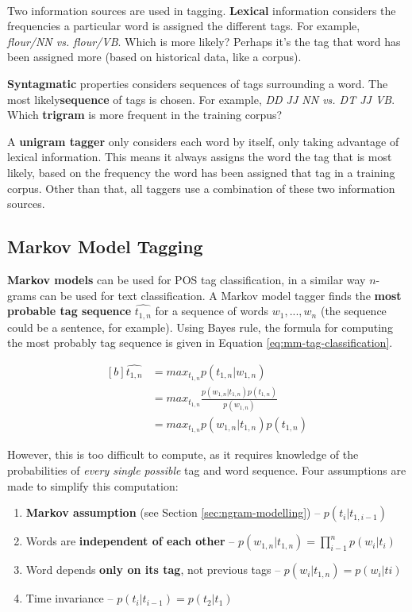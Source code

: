 \documentclass{article}
\begin{document}
\paragraph{}

Two information sources are used in tagging. \textbf{Lexical} information considers the frequencies a particular word is assigned the different tags. For example, \textit{flour/NN vs. flour/VB}. Which is more likely? Perhaps it's the tag that word has been assigned more (based on historical data, like a corpus).

\textbf{Syntagmatic} properties considers sequences of tags surrounding a word. The most likely\textbf{sequence} of tags is chosen. For example, \textit{DD JJ NN vs. DT JJ VB}. Which \textbf{trigram} is more frequent in the training corpus?

A \textbf{unigram tagger} only considers each word by itself, only taking advantage of lexical information. This means it always assigns the word the tag that is most likely, based on the frequency the word has been assigned that tag in a training corpus. Other than that, all taggers use a combination of these two information sources.

\subsection{Markov Model Tagging}

\textbf{Markov models} can be used for POS tag classification, in a similar way $n$-grams can be used for text classification. A Markov model tagger finds the \textbf{most probable tag sequence} $\hat{t_{1,n}}$ for a sequence of words $w_1,...,w_n$ (the sequence could be a sentence, for example). Using Bayes rule, the formula for computing the most probably tag sequence is given in Equation \ref{eq:mm-tag-classification}.

\begin{equation}
\begin{aligned}[b]
	\hat{t_{1,n}} &= max_{t_{1,n}} p(t_{1,n}|w_{1,n}) \\
	&= max_{t_{1,n}} \frac{p(w_{1,n}|t_{1,n})p(t_{1,n})}{p(w_{1,n})} \\
	&= max_{t_{1,n}} p(w_{1,n}|t_{1,n})p(t_{1,n})
\end{aligned}
\label{eq:mm-tag-classification}
\end{equation}

However, this is too difficult to compute, as it requires knowledge of the probabilities of \textit{every single possible} tag and word sequence. Four assumptions are made to simplify this computation:
\begin{enumerate}
	\item \textbf{Markov assumption} (see Section \ref{sec:ngram-modelling}) -- $p(t_i|t_{1,i-1})$
	\item Words are \textbf{independent of each other} --
	$p(w_{1,n}|t_{1,n}) = \prod_{i-1}^n { p(w_i|t_i) }$
	\item Word depends \textbf{only on its tag}, not previous tags -- $p(w_i|t_{1,n}) = p(w_i|ti)$
	\item Time invariance -- $p(t_i|t_{i-1}) = p(t_2|t_1)$
\end{enumerate}
\end{document}
